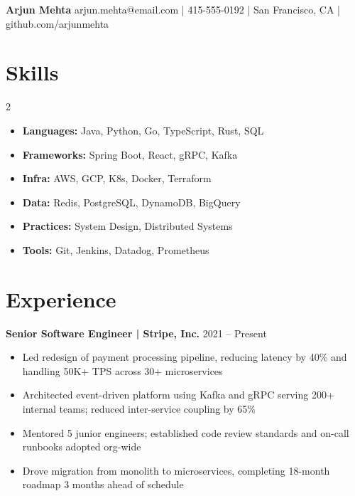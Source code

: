 \documentclass[9pt,letterpaper]{article}
\begin{document}
{\large\bfseries Arjun Mehta} \hfill {\small arjun.mehta@email.com | 415-555-0192 | San Francisco, CA | github.com/arjunmehta}

\section{Skills}

\begin{multicols}{2}
\begin{itemize}[leftmargin=1em, topsep=0pt, itemsep=0pt, parsep=0pt]
  \item \textbf{Languages:} Java, Python, Go, TypeScript, Rust, SQL
  \item \textbf{Frameworks:} Spring Boot, React, gRPC, Kafka
  \item \textbf{Infra:} AWS, GCP, K8s, Docker, Terraform
  \item \textbf{Data:} Redis, PostgreSQL, DynamoDB, BigQuery
  \item \textbf{Practices:} System Design, Distributed Systems
  \item \textbf{Tools:} Git, Jenkins, Datadog, Prometheus
\end{itemize}
\end{multicols}

\vspace{-4pt}
\section{Experience}

\textbf{Senior Software Engineer | Stripe, Inc.} \hfill 2021 -- Present
\begin{itemize}[leftmargin=1em, topsep=1pt, itemsep=0pt, parsep=0pt]
  \item Led redesign of payment processing pipeline, reducing latency by 40\% and handling 50K+ TPS across 30+ microservices
  \item Architected event-driven platform using Kafka and gRPC serving 200+ internal teams; reduced inter-service coupling by 65\%
  \item Mentored 5 junior engineers; established code review standards and on-call runbooks adopted org-wide
  \item Drove migration from monolith to microservices, completing 18-month roadmap 3 months ahead of schedule
\end{itemize}
\end{document}

